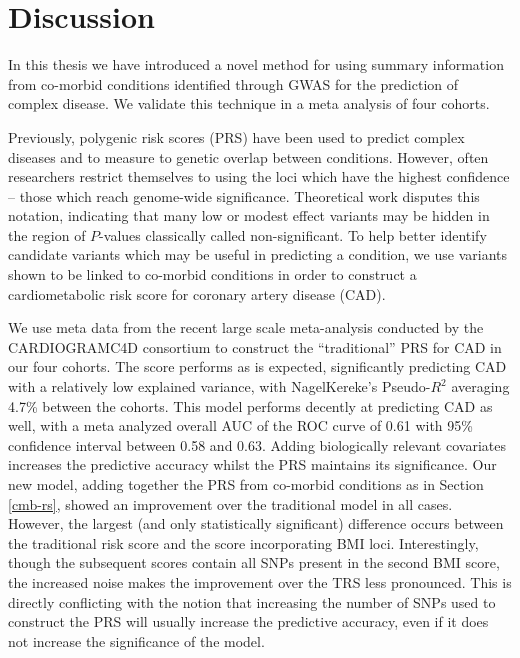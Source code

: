 \chapter{Discussion}

In this thesis we have introduced a novel method for using summary information from co-morbid conditions identified through \ac{GWAS} for the prediction of complex disease. We validate this technique in a meta analysis of four cohorts.

Previously, polygenic risk scores (\ac{PRS}) have been used to predict complex diseases and to measure to genetic overlap between conditions. However, often researchers restrict themselves to using the loci which have the highest confidence -- those which reach genome-wide significance. Theoretical work disputes this notation, indicating that many low or modest effect variants may be hidden in the region of $P$-values classically called non-significant. To help better identify candidate variants which may be useful in predicting a condition, we use variants shown to be linked to co-morbid conditions in order to construct a cardiometabolic risk score for coronary artery disease (\ac{CAD}).

We use meta data from the recent large scale meta-analysis conducted by the \ac{CARDIOGRAMC4D} consortium to construct the ``traditional'' \ac{PRS} for \ac{CAD} in our four cohorts. The score performs as is expected, significantly predicting \ac{CAD} with a relatively low explained variance, with NagelKereke's Pseudo-$R^2$ averaging 4.7\% between the cohorts. This model performs decently at predicting \ac{CAD} as well, with a meta analyzed overall \ac{AUC} of the \ac{ROC} curve of 0.61 with 95\% confidence interval between 0.58 and 0.63. Adding biologically relevant covariates increases the predictive accuracy whilst the \ac{PRS} maintains its significance.  Our new model, adding together the \ac{PRS} from co-morbid conditions as in Section \ref{cmb-rs}, showed an improvement over the traditional model in all cases. However, the largest (and only statistically significant) difference occurs between the traditional risk score and the score incorporating BMI loci. Interestingly, though the subsequent scores contain all \acp{SNP} present in the second BMI score, the increased noise makes the improvement over the \ac{TRS} less pronounced. This is directly conflicting with the notion that increasing the number of \acp{SNP} used to construct the \ac{PRS} will usually increase the predictive accuracy, even if it does not increase the significance of the model.

